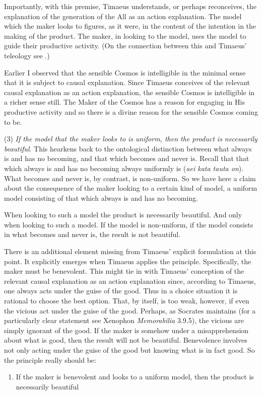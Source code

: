 Importantly, with this premise, Timaeus understands, or perhaps reconceives, the explanation of the generation of the All as an action explanation. The model which the maker looks to figures, as it were, in the content of the intention in the making of the product. The maker, in looking to the model, uses the model to guide their productive activity. (On the connection between this and Timaeus' teleology see \citealt{Johansen:2004dx}.)

Earlier I observed that the sensible Cosmos is intelligible in the minimal sense that it is subject to causal explanation. Since Timaeus conceives of the relevant causal explanation as an action explanation, the sensible Cosmos is intelligible in a richer sense still. The Maker of the Cosmos has a reason for engaging in His productive activity and so there is a divine reason for the sensible Cosmos coming to be.

(3) \emph{If the model that the maker looks to is uniform, then the product is necessarily beautiful}. This hearkens back to the ontological distinction between what always is and has no becoming, and that which becomes and never is. Recall that that which always is and has no becoming always uniformly is (\emph{aei kata tauta on}). What becomes and never is, by contrast, is non-uniform. So we have here a claim about the consequence of the maker looking to a certain kind of model, a uniform model consisting of that which always is and has no becoming. 

When looking to such a model the product is necessarily beautiful. And only when looking to such a model. If the model is non-uniform, if the model consists in what becomes and never is, the result is not beautiful. 

There is an additional element missing from Timaeus' explicit formulation at this point. It explicitly emerges when Timaeus applies the principle. Specifically, the maker must be benevolent. This might tie in with Timaeus' conception of the relevant causal explanation as an action explanation since, according to Timaeus, one always acts under the guise of the good. Thus in a choice situation it is rational to choose the best option. That, by itself, is too weak, however, if even the vicious act under the guise of the good. Perhaps, as Socrates maintains (for a particularly clear statement see Xenophon \emph{Memorabilia} 3.9.5), the vicious are simply ignorant of the good. If the maker is somehow under a misapprehension about what is good, then the result will not be beautiful. Benevolence involves not only acting under the guise of the good but knowing what is in fact good. So the principle really should be:
\begin{enumerate}[(3*)]
	\item If the maker is benevolent and looks to a uniform model, then the product is necessarily beautiful
\end{enumerate}

